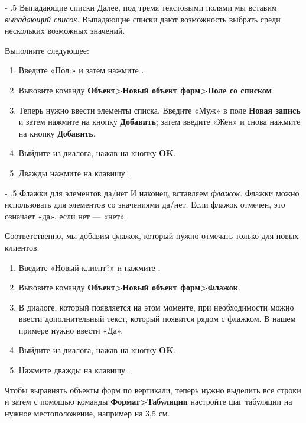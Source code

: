 ﻿\documentclass[a4paper,10pt]{article}
\makeatletter
\renewcommand\paragraph{%
   \@startsection{paragraph}{4}{0mm}%
      {-\baselineskip}%
      {.5\baselineskip}%
      {\normalfont\normalsize\bfseries}}
\makeatother
\begin{document}
 \paragraph{Выпадающие списки}
 Далее, под тремя текстовыми полями мы вставим \textit{выпадающий список}. Выпадающие списки дают возможность выбрать среди нескольких возможных значений.
 
 Выполните следующее:
 \begin{enumerate}
  \item Введите «Пол:» и затем нажмите .
  \item Вызовите команду \textbf{Объект>Новый объект форм>Поле со списком}
  \item Теперь нужно ввести элементы списка. Введите «Муж» в поле \textbf{Новая запись} и затем нажмите на кнопку \textbf{Добавить}; затем введите «Жен» и снова нажмите на кнопку \textbf{Добавить}.
  \item Выйдите из диалога, нажав на кнопку \textbf{OK}.
  \item Дважды нажмите на клавишу .
 \end{enumerate}


\paragraph{Флажки для элементов да/нет}
 И наконец, вставляем \textit{флажок}. Флажки можно использовать для элементов со значениями да/нет. Если флажок отмечен, это означает «да», если нет — «нет».
 
 Соответственно, мы добавим флажок, который нужно отмечать только для новых клиентов.
 
 \begin{enumerate}
  \item Введите «Новый клиент?» и нажмите .
  \item Вызовите команду \textbf{Объект>Новый объект форм>Флажок}.
  \item В диалоге, который появляется на этом моменте, при необходимости можно ввести дополнительный текст, который появится рядом с флажком. В нашем примере нужно ввести «Да».
  \item Выйдите из диалога, нажав на кнопку \textbf{OK}.
  \item Нажмите дважды на клавишу .
 \end{enumerate}

Чтобы выравнять объекты форм по вертикали, теперь нужно выделить все строки и затем с помощью команды \textbf{Формат>Табуляции} настройте шаг табуляции на нужное местоположение, например на 3,5 см.
\end{document}
